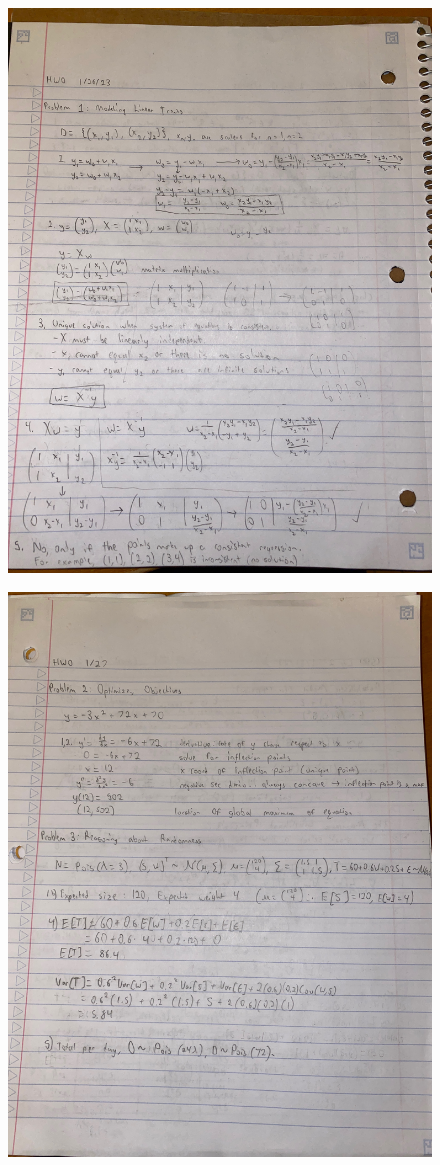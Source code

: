 \documentclass{harvardml}
\theoremstyle{definition}
\theoremstyle{plain}
\begin{document}
\begin{figure}
    \includegraphics[angle=270,width=\linewidth]{images/Problem 1 Algebra.jpeg}
\end{figure}
\begin{figure}
    \includegraphics[angle=270,width=\linewidth]{images/Problems 2,3 Math.jpeg}
\end{figure}
\end{document}
